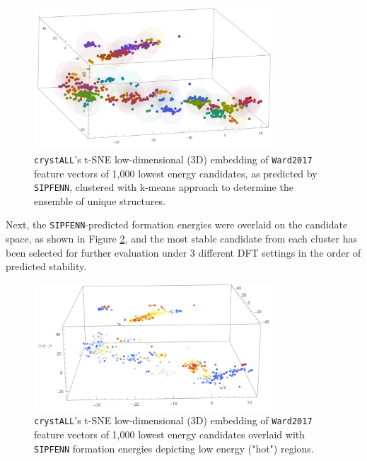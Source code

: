 \begin{figure}[H]
    \centering
    \includegraphics[width=0.8\textwidth]{crystall/crystall_NdBi2.png}
    \caption{\texttt{crystALL}'s t-SNE low-dimensional (3D) embedding of \texttt{Ward2017} feature vectors of 1,000 lowest energy  candidates, as predicted by \texttt{SIPFENN}, clustered with k-means approach to determine the ensemble of unique structures.}
    \label{crystall:fig:ndbi2clusters}
\end{figure}


Next, the \texttt{SIPFENN}-predicted formation energies were overlaid on the candidate space, as shown in Figure \ref{crystall:fig:ndbi2energies}, and the most stable candidate from each cluster has been selected for further evaluation under 3 different DFT settings in the order of predicted stability.


\begin{figure}[H]
    \centering
    \includegraphics[width=0.8\textwidth]{crystall/crystall_NdBi2_energies.png}
    \caption{\texttt{crystALL}'s t-SNE low-dimensional (3D) embedding of \texttt{Ward2017} feature vectors of 1,000 lowest energy  candidates overlaid with \texttt{SIPFENN} formation energies depicting low energy ("hot") regions.}
    \label{crystall:fig:ndbi2energies}
\end{figure}


